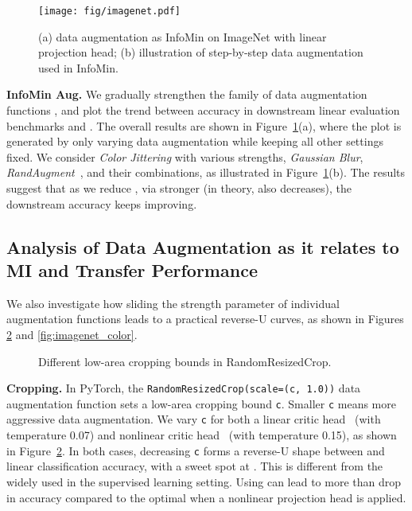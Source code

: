 \documentclass{article}
\begin{document}
\begin{figure}[h]
\centering
\texttt{[image: fig/imagenet.pdf]}
\vspace{-10pt}
\caption{(a) data augmentation as InfoMin on ImageNet with linear projection head; (b) illustration of step-by-step data augmentation used in InfoMin.}
\label{fig:imagenet}
\end{figure}
 
\textbf{InfoMin Aug.} We gradually strengthen the family of data augmentation functions , and plot the trend between accuracy in downstream linear evaluation benchmarks and . The overall results are shown in Figure~\ref{fig:imagenet}(a), where the plot is generated by only varying data augmentation while keeping all other settings fixed. We consider \emph{Color Jittering} with various strengths, \emph{Gaussian Blur}, \emph{RandAugment}~\cite{cubuk2019randaugment}, and their combinations, as illustrated in Figure~\ref{fig:imagenet}(b). The results suggest that as we reduce , via stronger  (in theory,  also decreases), the downstream accuracy keeps improving.

\subsection{Analysis of Data Augmentation as it relates to MI and Transfer Performance}


We also investigate how sliding the strength parameter of individual augmentation functions leads to a practical reverse-U curves, as shown in Figures \ref{fig:imagenet_crop} and \ref{fig:imagenet_color}.

\begin{figure}[ht]
\caption{Different low-area cropping bounds in RandomResizedCrop.}
\label{fig:imagenet_crop}
\end{figure} \textbf{Cropping.} In PyTorch, the \texttt{RandomResizedCrop(scale=(c, 1.0))} data augmentation function sets a low-area cropping bound \texttt{c}. Smaller \texttt{c} means more aggressive data augmentation. We vary \texttt{c} for both a linear critic head~\cite{wu2018unsupervised} (with temperature 0.07) and nonlinear critic head~\cite{chen2020simple} (with temperature 0.15), as shown in Figure~\ref{fig:imagenet_crop}. In both cases, decreasing \texttt{c} forms a reverse-U shape between  and linear classification accuracy, with a sweet spot at . This is different from the widely used  in the supervised learning setting. Using  can lead to more than  drop in accuracy compared to the optimal  when a nonlinear projection head is applied.
\end{document}
